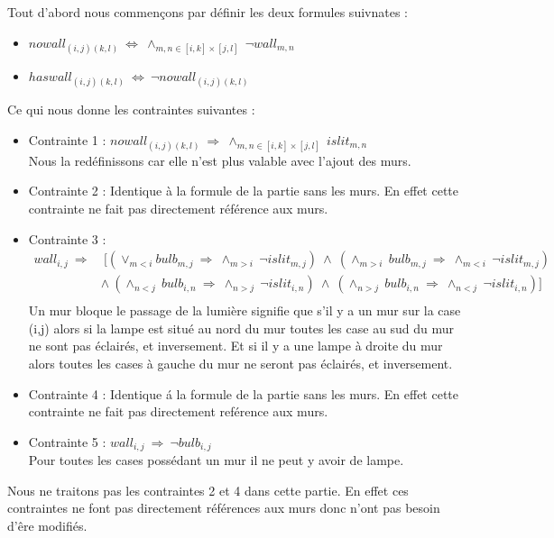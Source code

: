 \documentclass{article}
\begin{document}
Tout d'abord nous commençons par d\'efinir les deux formules suivnates :
\begin{itemize}
\item $ nowall_{(i,j)(k,l)} ~ \Leftrightarrow ~ \wedge_{m,n \in [i,k]\times[j,l]} ~ \neg wall_{m,n} $
\item $ haswall_{(i,j)(k,l)} ~ \Leftrightarrow ~ \neg nowall_{(i,j)(k,l)} $\\
\end{itemize}
Ce qui nous donne les contraintes suivantes :
\begin{itemize}
  
\item Contrainte 1 : $ nowall_{(i,j)(k,l)} ~ \Rightarrow ~ \wedge_{m,n \in [i,k]\times[j,l]} ~ islit_{m,n} $ \\
  Nous la redéfinissons car elle n'est plus valable avec l'ajout des murs. 
\item Contrainte 2 : Identique \`a la formule de la partie sans les murs. En effet cette contrainte ne fait pas directement réf\'erence aux murs.
\item Contrainte 3 :
\begin{align}
\nonumber
 wall_{i,j} ~ \Rightarrow &~ [(\vee_{m<i}bulb_{m,j} ~ \Rightarrow ~ \wedge_{m>i} ~ \neg islit_{m,j})~\wedge ~ (\wedge_{m>i} ~ bulb_{m,j} ~ \Rightarrow ~ \wedge_{m<i} ~ \neg islit_{m,j})\\
\nonumber
& \wedge ~ (\wedge_{n<j} ~ bulb_{i,n} ~ \Rightarrow ~ \wedge_{n>j} ~ \neg islit_{i,n})~ \wedge ~ (\wedge_{n>j} ~ bulb_{i,n} ~ \Rightarrow ~ \wedge_{n<j} ~ \neg islit_{i,n})]\\
\nonumber
\end{align}
Un mur bloque le passage de la lumière signifie que s'il y a un mur sur la case (i,j) alors si la lampe est situé au nord du mur toutes les case au sud du mur ne sont pas éclairés, et inversement. Et si il y a une lampe à droite du mur alors toutes les cases à gauche du mur ne seront pas éclairés, et inversement.
\item Contrainte 4 : Identique \'a la formule de la partie sans les murs. En effet cette contrainte ne fait pas directement ref\'erence aux murs.

\item Contrainte 5 : $ wall_{i,j} ~ \Rightarrow ~ \neg bulb_{i,j} $\\
Pour toutes les cases possédant un mur il ne peut y avoir de lampe.
\end{itemize}
Nous ne traitons pas les contraintes 2 et 4 dans cette partie. En effet ces contraintes ne font pas directement réf\'erences aux murs donc n'ont pas besoin d'êre modifiés. 
\end{document}

